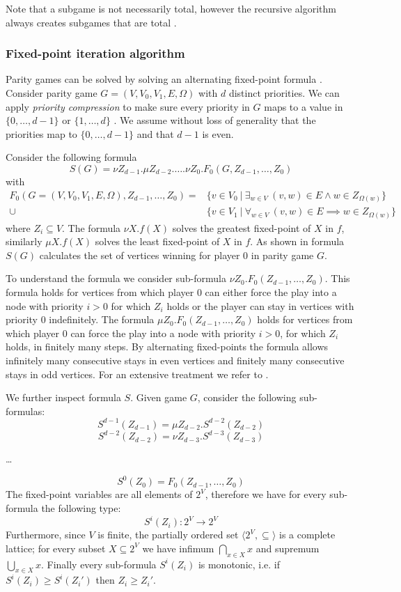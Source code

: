 Note that a subgame is not necessarily total, however the recursive algorithm always creates subgames that are total \cite{ZIELONKA1998135}.

\subsubsection{Fixed-point iteration algorithm}
Parity games can be solved by solving an alternating fixed-point formula \cite{WALUKIEWICZ2002311}. Consider parity game $G = (V,V_0,V_1, E, \Omega)$ with $d$ distinct priorities. We can apply \textit{priority compression} to make sure every priority in $G$ maps to a value in $\{0,\dots,d-1\}$ or $\{1, \dots, d\}$ \cite{SolvingInPractice,FPITE}. We assume without loss of generality that the priorities map to $\{0,\dots,d-1\}$ and that $d-1$ is even. 

Consider the following formula
\[ S(G) = \nu Z_{d-1}. \mu Z_{d-2}. \dots . \nu Z_0. F_0(G,Z_{d-1},\dots,Z_0) \]
with
\begin{align*}
 F_0(G = (V,V_0,V_1,E,\Omega),Z_{d-1},\dots,Z_0) = &\{ v \in V_0\ |\ \exists_{w\in V}\ (v,w) \in E \wedge w\in Z_{\Omega(w)} \}\\
  \cup &\{ v \in V_1\ |\ \forall_{w\in V}\ (v,w) \in E \implies w\in Z_{\Omega(w)} \}
\end{align*}
where $Z_i \subseteq V$. The formula $\nu X. f(X)$ solves the greatest fixed-point of $X$ in $f$, similarly $\mu X.f(X)$ solves the least fixed-point of $X$ in $f$. As shown in \cite{WALUKIEWICZ2002311} formula $S(G)$ calculates the set of vertices winning for player 0 in parity game $G$.

To understand the formula we consider sub-formula $\nu Z_0. F_0(Z_{d-1},\dots,Z_0)$. This formula holds for vertices from which player $0$ can either force the play into a node with priority $i > 0$ for which $Z_i$ holds or the player can stay in vertices with priority $0$ indefinitely. The formula $\mu Z_0. F_0(Z_{d-1},\dots,Z_0)$ holds for vertices from which player $0$ can force the play into a node with priority $i > 0$, for which $Z_i$ holds, in finitely many steps. By alternating fixed-points the formula allows infinitely many consecutive stays in even vertices and finitely many consecutive stays in odd vertices. For an extensive treatment we refer to \cite{WALUKIEWICZ2002311}.

We further inspect formula $S$. Given game $G$, consider the following sub-formulas:
\[ S^{d-1}(Z_{d-1}) = \mu Z_{d-2}.S^{d-2}(Z_{d-2})\]
\[ S^{d-2}(Z_{d-2}) = \nu Z_{d-3}.S^{d-3}(Z_{d-3})\]
\begin{center}
	\dots
\end{center}
\[ S^{0}(Z_0) = F_0(Z_{d-1},\dots,Z_0)\]
The fixed-point variables are all elements of $2^V$, therefore we have for every sub-formula the following type:
\[ S^i(Z_i) : 2^V \rightarrow 2^V \]
Furthermore, since $V$ is finite, the partially ordered set $\langle 2^V, \subseteq \rangle$ is a complete lattice; for every subset $X \subseteq 2^V$ we have infimum $\bigcap_{x \in X} x$ and supremum $\bigcup_{x \in X} x$. Finally every sub-formula $S^i(Z_i)$ is monotonic, i.e. if $S^i(Z_i) \geq S^i(Z_i')$ then $Z_i \geq Z_i'$.

